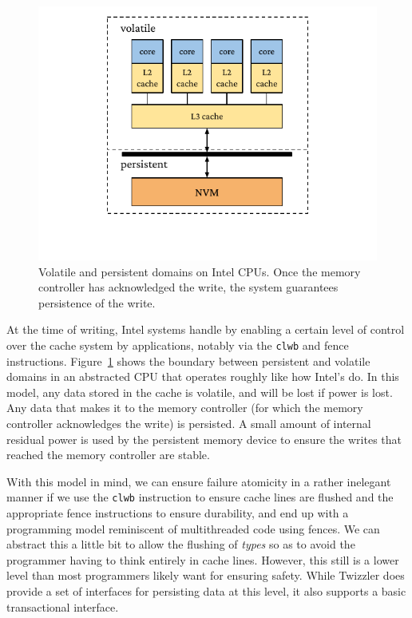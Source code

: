 \begin{figure}
    \centering
    \includegraphics[width=\linewidth]{fig/vpdomains.pdf}
    \caption{Volatile and persistent domains on Intel CPUs. Once the memory controller has acknowledged the write, the system guarantees persistence of the write.}
    \label{fig:vpdomains}
\end{figure}



At the time of writing, Intel systems handle \NVM by enabling a certain level of control over the cache system by
applications, notably via the \texttt{clwb} and fence instructions. Figure~\ref{fig:vpdomains} shows the boundary
between persistent and volatile domains in an abstracted CPU that operates roughly like how Intel's do. In this model,
any data stored in the cache is volatile, and will be lost if power is lost. Any data that makes it to the memory
controller (for which the memory controller acknowledges the write) is persisted. A small amount of internal residual
power is used by the persistent memory device to ensure the writes that reached the memory controller are stable.

With this model in mind, we can ensure failure atomicity in a rather inelegant manner if we use the \texttt{clwb}
instruction to ensure cache lines are flushed and the appropriate fence instructions to ensure durability, and end up
with a programming model reminiscent of multithreaded code using fences. We can abstract this a little bit to allow the
flushing of \emph{types} so as to avoid the programmer having to think entirely in cache lines. However, this still is a
lower level than most programmers likely want for ensuring safety. While Twizzler does provide a set of interfaces for
persisting data at this level, it also supports a basic transactional interface.


